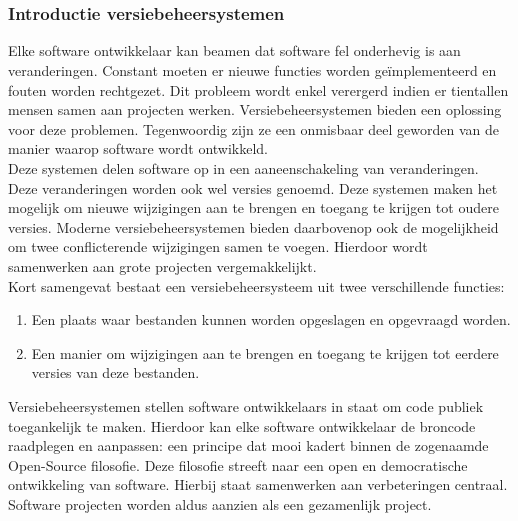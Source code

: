 
\chapter{}
\label{ch:inleiding}
\subsection{Introductie versiebeheersystemen}
Elke software ontwikkelaar kan beamen dat software fel onderhevig is aan veranderingen. Constant moeten er nieuwe functies worden geïmplementeerd en fouten worden rechtgezet. Dit probleem wordt enkel verergerd indien er tientallen mensen samen aan projecten werken. Versiebeheersystemen bieden een oplossing voor deze problemen. Tegenwoordig zijn ze een onmisbaar deel geworden van de manier waarop software wordt ontwikkeld.\\

Deze systemen delen software op in een aaneenschakeling van veranderingen. Deze veranderingen worden ook wel versies genoemd. Deze systemen maken het mogelijk om nieuwe wijzigingen aan te brengen en toegang te krijgen tot oudere versies. Moderne versiebeheersystemen bieden daarbovenop ook de mogelijkheid om twee conflicterende wijzigingen samen te voegen. Hierdoor wordt samenwerken aan grote projecten vergemakkelijkt.\\

Kort samengevat bestaat een versiebeheersysteem uit twee verschillende functies:

\begin{enumerate}
\item Een plaats waar bestanden kunnen worden opgeslagen en opgevraagd worden.
\item Een manier om wijzigingen aan te brengen en toegang te krijgen tot eerdere versies van deze bestanden.
\end{enumerate}

Versiebeheersystemen stellen software ontwikkelaars in staat om code publiek toegankelijk te maken. Hierdoor kan elke software ontwikkelaar de broncode raadplegen en aanpassen: een principe dat mooi kadert binnen de zogenaamde Open-Source filosofie. Deze filosofie streeft naar een open en democratische ontwikkeling van software. Hierbij staat samenwerken aan verbeteringen centraal. Software projecten worden aldus aanzien als een gezamenlijk project.

